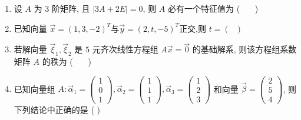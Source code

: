 \begin{enumerate}
	\item 设 $A$ 为 $3$ 阶矩阵, 且 $|3A+2E| = 0$, 则 $A$ 必有一个特征值为 ( \ \ \ )
	\vspace{0.5em}
	
	\item 已知向量 $\vec{x}=(1,3,-2)^T$与$\vec{y}=(2,t,-5)^T$正交,则 $t=( \ \ \ )$
	\vspace{0.5em}
	
	\item 若解向量 $\vec{\xi}_1, \vec{\xi}_2$ 是 $5$ 元齐次线性方程组 $A\vec{x}=\vec{0}$ 的基础解系, 则该方程组系数矩阵 $A$ 的秩为 ( \ \ \ )
	\vspace{0.5em}
	
	\item 已知向量组 $A: \vec{\alpha}_1 = \begin{pmatrix} 1 \\ 0 \\ 1 \end{pmatrix}, \vec{\alpha}_2 = \begin{pmatrix} 1 \\ 1 \\ 1 \end{pmatrix}, \vec{\alpha}_3 = \begin{pmatrix} 1 \\ 2 \\ 3 \end{pmatrix}$ 和向量 $\vec{\beta} = \begin{pmatrix} 2 \\ 5 \\ 4 \end{pmatrix}$, 则下列结论中正确的是 ( )
	\vspace{0.5em}
	

\end{enumerate}
